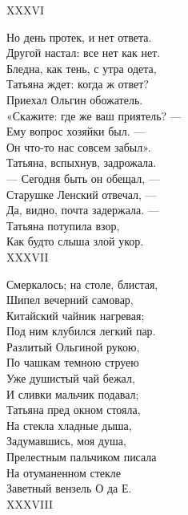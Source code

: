 {XXXVI

Но день протек, и нет ответа.\\
Другой настал: все нет как нет.\\
Бледна, как тень, с утра одета,\\
Татьяна ждет: когда ж ответ?\\
Приехал Ольгин обожатель.\\
«Скажите: где же ваш приятель? —\\
Ему вопрос хозяйки был. —\\
Он что-то нас совсем забыл».\\
Татьяна, вспыхнув, задрожала.\\
— Сегодня быть он обещал, —\\
Старушке Ленский отвечал, —\\
Да, видно, почта задержала. —\\
Татьяна потупила взор,\\
Как будто слыша злой укор.\\

XXXVII

Смеркалось; на столе, блистая,\\
Шипел вечерний самовар,\\
Китайский чайник нагревая;\\
Под ним клубился легкий пар.\\
Разлитый Ольгиной рукою,\\
По чашкам темною струею\\
Уже душистый чай бежал,\\
И сливки мальчик подавал;\\
Татьяна пред окном стояла,\\
На стекла хладные дыша,\\
Задумавшись, моя душа,\\
Прелестным пальчиком писала\\
На отуманенном стекле\\
Заветный вензель О да Е.\\

XXXVIII

}
